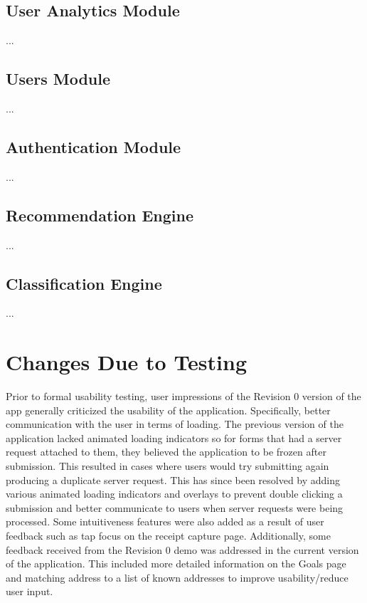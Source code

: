 \documentclass[12pt, titlepage]{article}
\begin{document}
\subsection{User Analytics Module}

...

\subsection{Users Module}

...

\subsection{Authentication Module}

...

\subsection{Recommendation Engine}

...

\subsection{Classification Engine}

...

\section{Changes Due to Testing}


Prior to formal usability testing, user impressions of the Revision 0 version of the app
generally criticized the usability of the application. Specifically, better communication with
the user in terms of loading. The previous version of the application lacked animated loading
indicators so for forms that had a server request attached to them, they believed the application
to be frozen after submission. This resulted in cases where users would try submitting again producing
a duplicate server request. This has since been resolved by adding various animated loading indicators
and overlays to prevent double clicking a submission and better communicate to users when server requests
were being processed. Some intuitiveness features were also added as a result of user feedback such as
tap focus on the receipt capture page. Additionally, some feedback received from the Revision 0 demo
was addressed in the current version of the application. This included more detailed information
on the Goals page and matching address to a list of known addresses to improve usability/reduce user
input.\\
\end{document}
